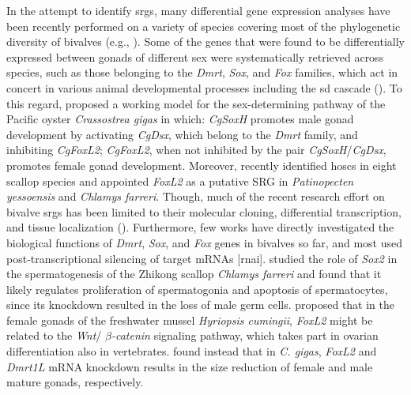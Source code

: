 \documentclass[../main.tex]{subfiles}
\begin{document}
In the attempt to identify \glspl{srg}, many differential gene expression analyses have been recently performed on a variety of species covering most of the phylogenetic diversity of bivalves (e.g., \textbf{\cite{milani2013nuclear,zhang2014genomic,chen2017transcriptome,capt2018deciphering,ghiselli2018comparative,shi2018proteome}}). Some of the genes that were found to be differentially expressed between gonads of different sex were systematically retrieved across species, such as those belonging to the \textit{Dmrt}, \textit{Sox}, and \textit{Fox} families, which act in concert in various animal developmental processes including the \gls{sd} cascade (\textbf{\cite{marshall2010homologies,beukeboom2014evolution}}). To this regard, \textbf{\cite{zhang2014genomic}} proposed a working model for the sex-determining pathway of the Pacific oyster \textit{Crassostrea gigas} in which: \textit{CgSoxH} promotes male gonad development by activating \textit{CgDsx}, which belong to the \textit{Dmrt} family, and inhibiting \textit{CgFoxL2}; \textit{CgFoxL2}, when not inhibited by the pair \textit{CgSoxH}/\textit{CgDsx}, promotes female gonad development. Moreover, \textbf{\cite{han2022ancient}} recently identified \glspl{hosc} in eight scallop species and appointed \textit{FoxL2} as a putative SRG in \textit{Patinopecten yessoensis} and \textit{Chlamys farreri}. Though, much of the recent research effort on bivalve \glspl{srg} has been limited to their molecular cloning, differential transcription, and tissue localization (\textbf{\cite{liang2019sox2,sun2022examination}}). Furthermore, few works have directly investigated the biological functions of \textit{Dmrt}, \textit{Sox}, and \textit{Fox} genes in bivalves so far, and most used post-transcriptional silencing of target mRNAs [\gls{rnai}]. \textbf{\cite{liang2019sox2}} studied the role of \textit{Sox2} in the spermatogenesis of the Zhikong scallop \textit{Chlamys farreri} and found that it likely regulates proliferation of spermatogonia and apoptosis of spermatocytes, since its knockdown resulted in the loss of male germ cells. \textbf{\cite{wang2020identification}} proposed that in the female gonads of the freshwater mussel \textit{Hyriopsis cumingii}, \textit{FoxL2} might be related to the \textit{Wnt}/\textit{ $\beta$-catenin} signaling pathway, which takes part in ovarian differentiation also in vertebrates. \textbf{\cite{sun2022examination}} found instead that in \textit{C. gigas}, \textit{FoxL2} and \textit{Dmrt1L} mRNA knockdown results  in the size reduction of female and male mature gonads, respectively.
\end{document}
